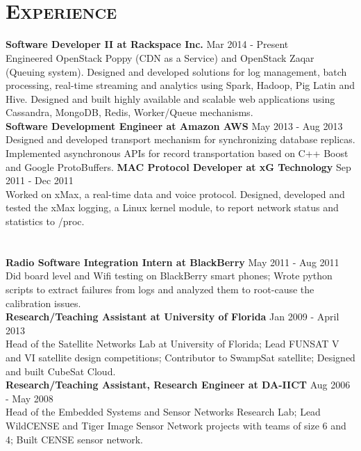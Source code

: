 \begin{resume}
\begin{formatb}
  \\
  \body\\
\end{formatb}

\section{\textsc{Experience}}
\textbf{Software Developer II at Rackspace Inc.} \hfill Mar 2014 - Present\\
Engineered OpenStack Poppy (CDN as a Service) and OpenStack Zaqar (Queuing system). Designed and developed solutions for log management, batch processing, real-time streaming and analytics using Spark, Hadoop, Pig Latin and Hive. Designed and built highly available and scalable web applications using Cassandra, MongoDB, Redis, Worker/Queue mechanisms.\\
\textbf{Software Development Engineer at Amazon AWS} \hfill May 2013 - Aug 2013\\
Designed and developed transport mechanism for synchronizing database replicas. Implemented asynchronous APIs for record transportation based on C++ Boost and Google ProtoBuffers.
\textbf{MAC Protocol Developer at xG Technology} \hfill Sep 2011 - Dec 2011\\
Worked on xMax, a real-time data and voice protocol. Designed, developed and tested the xMax logging, a Linux kernel module, to report network status and statistics to /proc.\\ \\ \\
\textbf{Radio Software Integration Intern at BlackBerry} \hfill May 2011 - Aug 2011\\
Did board level and Wifi testing on BlackBerry smart phones; Wrote python scripts to extract failures from logs and analyzed them to root-cause the calibration issues.\\
\textbf{Research/Teaching Assistant at University of Florida} \hfill Jan 2009 - April 2013\\
Head of the Satellite Networks Lab at University of Florida; Lead FUNSAT V and VI satellite design competitions; Contributor to SwampSat satellite; Designed and built CubeSat Cloud.\\
\textbf{Research/Teaching Assistant, Research Engineer at DA-IICT} \hfill Aug 2006 - May 2008 \\
Head of the Embedded Systems and Sensor Networks Research Lab; Lead WildCENSE and Tiger Image Sensor Network projects with teams of size 6 and 4; Built CENSE sensor network.


\end{resume}
